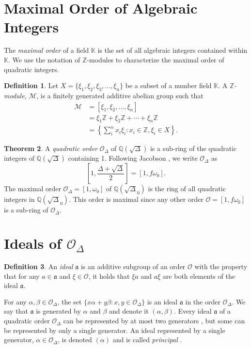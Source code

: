 \documentclass{ucalgthes1}
\theoremstyle{definition}
\newtheorem{thm}{Theorem}[section]
\newtheorem{defn}[thm]{Definition}
\newcommand{\KK}{\mathbb{K}}
\newcommand{\MM}{\mathcal{M}}
\newcommand{\OO}{\mathcal{O}}
\newcommand{\ZZ}{\mathbb{Z}}
\newcommand{\QQ}{\mathbb{Q}}
\begin{document}
\bigbreak
\section{Maximal Order of Algebraic Integers}

The \emph{maximal order} of a field $\KK$ is the set of all algebraic integers contained within $\KK$.  We use the notation of $\ZZ$-modules to characterize the maximal order of quadratic integers.


\begin{defn}
Let $X = \{ \xi_1, \xi_2, \xi_3, ..., \xi_n \}$ be a subset of a number field $\KK$.  A \emph{$\ZZ$\mbox{-}module}, $\MM$, is a finitely generated additive abelian group such that
\begin{align*}
	\MM &= [ \xi_1, \xi_2, ..., \xi_n ] \\
	& =  \xi_1 \ZZ + \xi_2 \ZZ + \cdots + \xi_n \ZZ \\
	& = \left \{ \sum_{i}^n x_i \xi_i : x_i \in \ZZ, \xi_i \in X \right \}.
\end{align*}
\end{defn}

\begin{thm}
A \emph{quadratic order} $\OO_\Delta$ of $\QQ(\sqrt\Delta)$ is a sub-ring of the quadratic integers of $\QQ(\sqrt\Delta)$ containing 1.  Following Jacobson \cite[p.81]{Jacobson2009}, we write $\OO_\Delta$ as
\[
	\left[ 1, \frac{\Delta + \sqrt{\Delta}}{2} \right] = [1, f\omega_0].
\]
The maximal order $\OO_\Delta = [1, \omega_0]$ of $\QQ(\sqrt\Delta_0)$ is the ring of all quadratic integers in $\QQ(\sqrt\Delta_0)$.  This order is maximal since any other order $\OO = [1, f\omega_0]$ is a sub-ring of $\OO_\Delta$. 
\end{thm}


\bigbreak
\section{Ideals of $\OO_\Delta$}

\begin{defn}
An \emph{ideal} $\mathfrak a$ is an additive subgroup of an order $\OO$ with the property that for any $a \in \mathfrak a$ and $\xi \in \OO$, it holds that $\xi a$ and $a \xi$ are both elements of the ideal $\mathfrak a$.
\end{defn}

For any $\alpha, \beta \in \OO_\Delta$, the set $\{x \alpha + y \beta : x, y \in \OO_\Delta\}$ is an ideal $\mathfrak a$ in the order $\OO_\Delta$.  We say that $\mathfrak a$ is generated by $\alpha$ and $\beta$ and denote it $(\alpha, \beta)$.  Every ideal $\mathfrak a$ of a quadratic order $\OO_\Delta$ can be represented by at most two generators \cite{Cohn1980}, but some can be represented by only a single generator. An ideal represented by a single generator, $\alpha \in \OO_\Delta$, is denoted $(\alpha)$ and is called \emph{principal} \cite[p.87]{Jacobson2009}.
\end{document}
